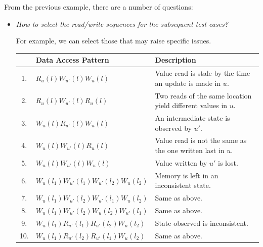 From the previous example, there are a number of questions:
\begin{itemize}
    \item \emph{How to select the read/write sequences for the subsequent test cases?}

    For example, we can select those that may raise specific issues.
    \begin{table}[!htp]
        \centering
        \begin{tabular}{@{} c | l | p{15em} @{}}
            \toprule
             & \textbf{Data Access Pattern} & \textbf{Description} \\
            \midrule
            1. & $R_{u}\left(l\right) W_{u'}\left(l\right) W_{u}\left(l\right)$ & Value read is stale by the time an update is made in $u$. \\
            \cmidrule{1-3}
            2. & $R_{u}\left(l\right) W_{u'}\left(l\right) R_{u}\left(l\right)$ & Two reads of the same location yield different values in $u$. \\
            \cmidrule{1-3}
            3. & $W_{u}\left(l\right) R_{u'}\left(l\right) W_{u}\left(l\right)$ & An intermediate state is observed by $u'$. \\
            \cmidrule{1-3}
            4. & $W_{u}\left(l\right) W_{u'}\left(l\right) R_{u}\left(l\right)$ & Value read is not the same as the one written last in $u$. \\
            \cmidrule{1-3}
            5. & $W_{u}\left(l\right) W_{u'}\left(l\right) W_{u}\left(l\right)$ & Value written by $u'$ is lost. \\
            \cmidrule{1-3}
            6. & $W_{u}\left(l_{1}\right) W_{u'}\left(l_{1}\right) W_{u'}\left(l_{2}\right) W_{u}\left(l_{2}\right)$ & Memory is left in an inconsistent state. \\
            \cmidrule{1-3}
            7. & $W_{u}\left(l_{1}\right) W_{u'}\left(l_{2}\right) W_{u'}\left(l_{1}\right) W_{u}\left(l_{2}\right)$ & Same as above. \\
            \cmidrule{1-3}
            8. & $W_{u}\left(l_{1}\right) W_{u'}\left(l_{2}\right) W_{u}\left(l_{2}\right) W_{u'}\left(l_{1}\right)$ & Same as above. \\
            \cmidrule{1-3}
            9. & $W_{u}\left(l_{1}\right) R_{u'}\left(l_{1}\right) R_{u'}\left(l_{2}\right) W_{u}\left(l_{2}\right)$ & State observed is inconsistent. \\
            \cmidrule{1-3}
            10. & $W_{u}\left(l_{1}\right) R_{u'}\left(l_{2}\right) R_{u'}\left(l_{1}\right) W_{u}\left(l_{2}\right)$ & Same as above. \\

\end{tabular}
\end{table}
\end{itemize}
